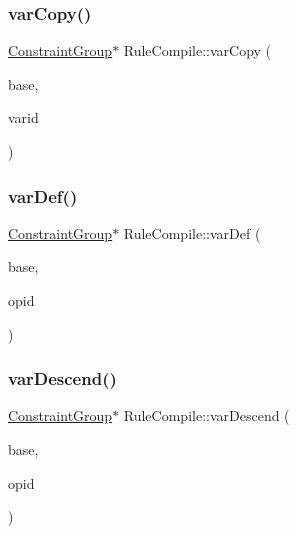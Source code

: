 \mbox{\label{class_rule_compile_a45977afd1a9c72061ff1ac31fb3dd60c}} 
\subsubsection{\texorpdfstring{varCopy()}{varCopy()}}
{\footnotesize\ttfamily \mbox{\hyperlink{class_constraint_group}{Constraint\+Group}}$\ast$ Rule\+Compile\+::var\+Copy (\begin{DoxyParamCaption}\item[{\mbox{\hyperlink{class_constraint_group}{Constraint\+Group}} $\ast$}]{base,  }\item[{int4}]{varid }\end{DoxyParamCaption})}

\mbox{\label{class_rule_compile_a1c85da41f18b2470001e5b7c6aced831}} 
\subsubsection{\texorpdfstring{varDef()}{varDef()}}
{\footnotesize\ttfamily \mbox{\hyperlink{class_constraint_group}{Constraint\+Group}}$\ast$ Rule\+Compile\+::var\+Def (\begin{DoxyParamCaption}\item[{\mbox{\hyperlink{class_constraint_group}{Constraint\+Group}} $\ast$}]{base,  }\item[{int4}]{opid }\end{DoxyParamCaption})}

\mbox{\label{class_rule_compile_a4fa11cc8b559d659200a8b00715ec463}} 
\subsubsection{\texorpdfstring{varDescend()}{varDescend()}}
{\footnotesize\ttfamily \mbox{\hyperlink{class_constraint_group}{Constraint\+Group}}$\ast$ Rule\+Compile\+::var\+Descend (\begin{DoxyParamCaption}\item[{\mbox{\hyperlink{class_constraint_group}{Constraint\+Group}} $\ast$}]{base,  }\item[{int4}]{opid }\end{DoxyParamCaption})}

